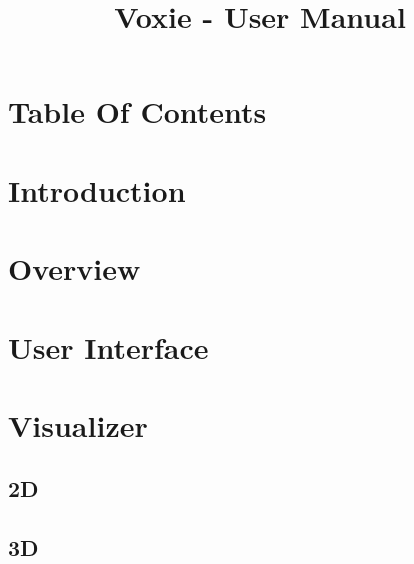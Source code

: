 \documentclass[]{article}
\title{Voxie - User Manual}
\author{}
\begin{document}
\maketitle

\section{Table Of Contents}
\tableofcontents
\newpage

\section{Introduction}


\section{Overview}

\section{User Interface}

\section{Visualizer}

\subsection{2D}

\subsection{3D}

%
%
\end{document}
